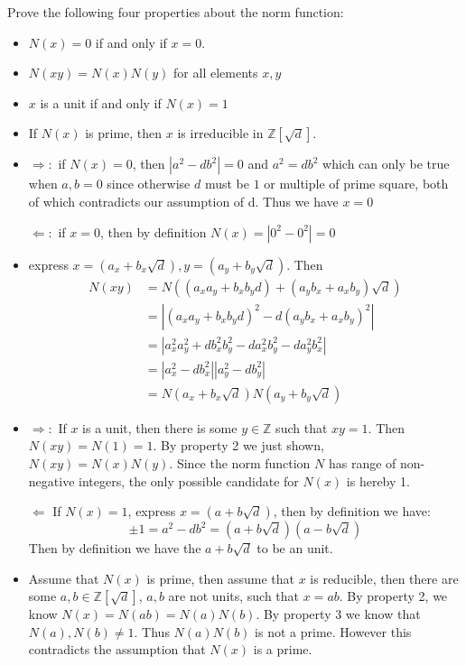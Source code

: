 \documentclass[11pt, oneside]{article}
\newcommand{\Z}{\mathbb Z}
\begin{document}
\begin{enumerate}
Prove the following four properties about the norm function:
\begin{itemize}
\item $N(x)=0$ if and only if $x=0$.
\item $N(xy) = N(x)N(y)$ for all elements $x,y$
\item $x$ is a unit if and only if $N(x)=1$
\item If $N(x)$ is prime, then $x$ is irreducible in $\Z[\sqrt{d}]$.
\end{itemize}
\hrulefill
\begin{itemize}
    \newline
    \item $\Rightarrow:$ if $N(x)=0$, then $|a^2-db^2|=0$ and $a^2=db^2$ which can only be true when $a,b=0$ since otherwise $d$ must be $1$ or multiple of prime square, both of which contradicts our assumption of d. Thus we have $x=0$
    
    $\Leftarrow: $ if $x=0$, then by definition $N(x)=|0^2-0^2|=0$
    \item express $x=(a_x +b_x\sqrt{d}), y=(a_y +b_y\sqrt{d})$. Then 
    \begin{equation}
    \begin{split}
        N(xy)&=N((a_xa_y+b_xb_yd)+(a_yb_x+a_xb_y)\sqrt{d})\\
        &=|(a_xa_y+b_xb_yd)^2- d(a_yb_x+a_xb_y)^2 | \\ 
        &=|a_x^2a_y^2+db_x^2b_y^2-da_x^2b_y^2-da_y^2b_x^2|\\
        &=|a_x^2-db_x^2||a_y^2-db_y^2|\\
        &=N(a_x+b_x\sqrt{d})N(a_y+b_y\sqrt{d})
    \end{split}
    \end{equation}
    \item $\Rightarrow:$ If $x$ is a unit, then there is some $y\in \Z$ such that $xy=1$. Then $N(xy)=N(1)=1$. By property 2 we just shown, $N(xy)=N(x)N(y)$. Since the norm function $N$ has range of non-negative integers, the only possible candidate for $N(x)$ is hereby 1.
    
    $\Leftarrow$ If $N(x)=1$, express $x=(a +b\sqrt{d})$, then by definition we have:
    \[\pm1=a^2-db^2=(a+b\sqrt{d})(a-b\sqrt{d})\]
    Then by definition we have the $a+b\sqrt{d}$ to be an unit. 
    
    \item Assume that $N(x)$ is prime, then assume that $x$ is reducible, then there are some $a,b\in \Z[\sqrt{d}]$, $a,b$ are not units, such that $x=ab$. By property 2, we know $N(x)=N(ab)=N(a)N(b)$. By property 3 we know that $N(a),N(b)\neq 1$. Thus $N(a)N(b)$ is not a prime. However this contradicts the assumption that $N(x)$ is a prime. 
\end{itemize}



\end{enumerate}
\end{document}
